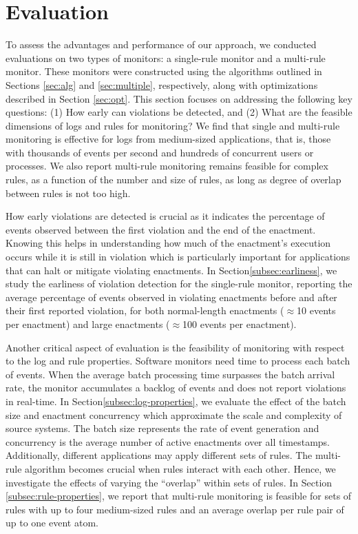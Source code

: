 \section{Evaluation}
\label{sec:eval}

To assess the advantages and performance of our approach,
we conducted evaluations on two types of monitors:
a single-rule monitor and a multi-rule monitor.
These monitors were constructed using the algorithms outlined in Sections \ref{sec:alg} and \ref{sec:multiple}, respectively, along with optimizations described in Section \ref{sec:opt}.
This section focuses on addressing the following key questions:
(1) How early can violations be detected, and
(2) What are the feasible dimensions of logs and rules for monitoring?
We find that single and multi-rule monitoring is effective
for logs from medium-sized applications,
that is,
those with thousands of events per second
and hundreds of concurrent users or processes.
We also report multi-rule monitoring remains feasible
for complex rules,
as a function of the number and size of rules,
as long as degree of overlap between rules is not too high.

How early violations are detected is crucial
as it indicates the percentage of events observed
between the first violation and the end of the enactment.
Knowing this helps in understanding how much of the enactment's
execution occurs while it is still in violation
which is particularly important for applications
that can halt or mitigate violating enactments.
In Section\:\ref{subsec:earliness},
we study the earliness of violation detection
for the single-rule monitor,
reporting the average percentage of events observed
in violating enactments before and after their first reported violation,
for both normal-length enactments
($\approx$10 events per enactment)
and large enactments ($\approx$100 events per enactment).

Another critical aspect of evaluation is the feasibility
of monitoring with respect to the log and rule properties.
Software monitors need time to process each batch of events.
When the average batch processing time surpasses the batch arrival rate,
the monitor accumulates a backlog of events and does not report violations in real-time. 
In Section\:\ref{subsec:log-properties},
we evaluate the effect of
the batch size and enactment concurrency
which approximate the scale and complexity of source systems.
The batch size represents the rate of event generation
and
concurrency is the average number of active enactments
over all timestamps.
Additionally,
different applications may apply different sets of rules.
The multi-rule algorithm
becomes crucial when rules interact with each other.
Hence, we investigate the effects of varying the ``overlap''
within sets of rules.
In Section \ref{subsec:rule-properties}, we report that multi-rule
monitoring is feasible for sets of rules with up to four medium-sized
rules and an average overlap per rule pair of up to one event atom.

